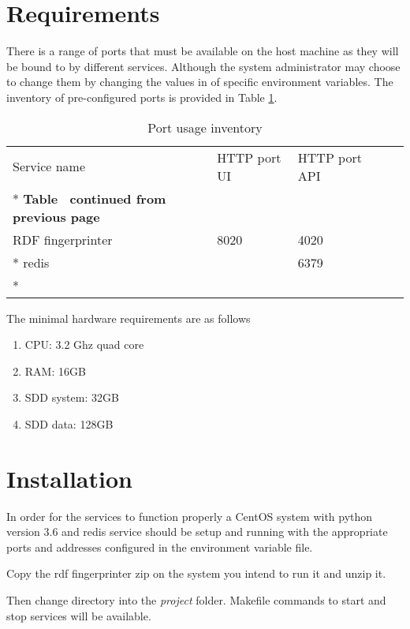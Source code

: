 \section{Requirements}
\label{sec:requirements}
There is a range of ports that must be available on the host machine as they will be bound to by different services. Although the system administrator may choose to change them by changing the values in of specific environment variables. The inventory of pre-configured ports is provided in Table \ref{tab:fingerprinter-port-inventory}.

\begin{longtable}[c]{@{}p{3.64cm}p{1.25cm}p{1.25cm}p{1.9cm}p{5cm}@{}}
	\toprule
	Service name  & HTTP port UI & HTTP port API                \\* \midrule
	\endfirsthead
	\multicolumn{5}{c}%
	{{\bfseries Table \thetable\ continued from previous page}} \\
	\endhead
	\bottomrule
	\endfoot
	\endlastfoot
	RDF fingerprinter & 8020         & 4020                         \\* \hline
	redis         &              & 6379                         \\* \bottomrule
	\caption{Port usage inventory}
	\label{tab:fingerprinter-port-inventory}                        \\
\end{longtable}

The minimal hardware requirements are as follows 
\begin{enumerate}
	\item CPU: 3.2 Ghz quad core
	\item RAM: 16GB
	\item SDD system: 32GB
	\item SDD data: 128GB
\end{enumerate}

\section{Installation}
\label{sec:installation}
In order for the services to function properly a CentOS system with python version 3.6  and redis service should be setup and running with the appropriate ports and addresses configured in the environment variable file. 

Copy the rdf fingerprinter zip on the system you intend to run it and unzip it.

Then change directory into the \textit{project} folder. Makefile commands to start and stop services will be available. 	

